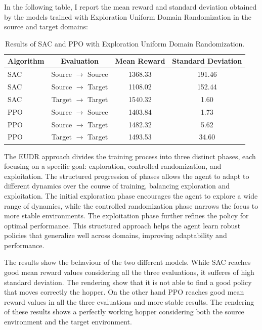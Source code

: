 \documentclass[12pt]{article}
\begin{document}
In the following table, I report the mean reward and standard deviation obtained by the models trained with Exploration Uniform Domain Randomization in the source and target domains:

\begin{table}[H]
    \centering
    \begin{tabular}{|l|c|c|c|}
        \hline
        \textbf{Algorithm} & \textbf{Evaluation} & \textbf{Mean Reward} & \textbf{Standard Deviation} \\ \hline
        SAC & Source $\rightarrow$ Source & 1368.33 & 191.46 \\ 
        SAC & Source $\rightarrow$ Target & 1108.02 & 152.44 \\ 
        SAC & Target $\rightarrow$ Target & 1540.32 & 1.60 \\ \hline
        PPO & Source $\rightarrow$ Source & 1403.84 & 1.73 \\ 
        PPO & Source $\rightarrow$ Target & 1482.32 & 5.62 \\ 
        PPO & Target $\rightarrow$ Target & 1493.53 & 34.60 \\ \hline
    \end{tabular}
    \caption{Results of SAC and PPO with Exploration Uniform Domain Randomization.}
    \label{tab:results_eudr}
\end{table}

The EUDR approach divides the training process into three distinct phases, each focusing on a specific goal: exploration, controlled randomization, and exploitation. The structured progression of phases allows the agent to adapt to different dynamics over the course of training, balancing exploration and exploitation. The initial exploration phase encourages the agent to explore a wide range of dynamics, while the controlled randomization phase narrows the focus to more stable environments. The exploitation phase further refines the policy for optimal performance. This structured approach helps the agent learn robust policies that generalize well across domains, improving adaptability and performance.

The results show the behaviour of the two different models. While SAC reaches good mean reward values considering all the three evaluations, it sufferes of high standard deviation. The rendering show that it is not able to find a good policy that moves correctly the hopper. On the other hand PPO reaches good mean reward values in all the three evaluations and more stable results. The rendering of these results shows a perfectly working hopper considering both the source environment and the target environment. 
\end{document}
